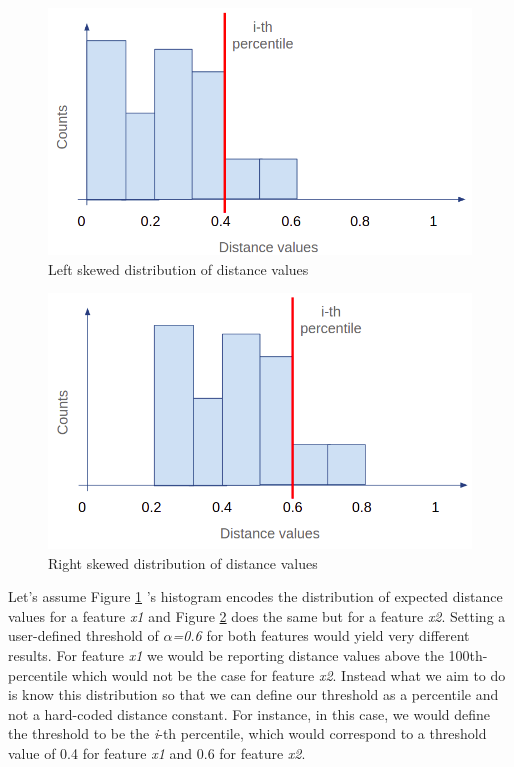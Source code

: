 \begin{figure}[!htb]
    \begin{center}
      \includegraphics[scale=0.4]{figures/skewed-left-distro.png}
      \caption[]{Left skewed distribution of distance values}
      \label{fig:skewed-left-distro}
    \end{center}
\end{figure}

\begin{figure}[!htb]
    \begin{center}
      \includegraphics[scale=0.4]{figures/skewed-right-distro.png}
      \caption[]{Right skewed distribution of distance values}
      \label{fig:skewed-right-distro}
    \end{center}
\end{figure}

Let's assume Figure \ref{fig:skewed-left-distro} 's histogram encodes the distribution of expected distance values for a feature \textit{x1} and Figure \ref{fig:skewed-right-distro} does the same but for a feature \textit{x2}. Setting a user-defined threshold of \textit{$\alpha$=0.6} for both features would yield very different results. For feature \textit{x1} we would be reporting distance values above the 100th-percentile which would not be the case for feature \textit{x2}. Instead what we aim to do is know this distribution so that we can define our threshold as a percentile and not a hard-coded distance constant. For instance, in this case, we would define the threshold to be the \textit{i}-th percentile, which would correspond to a threshold value of 0.4 for feature \textit{x1} and 0.6 for feature \textit{x2}.

